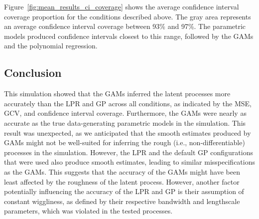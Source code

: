 \documentclass[man, floatsintext]{apa7}
\begin{document}
Figure~\ref{fig:mean_results_ci_coverage} shows the average confidence interval
coverage proportion for the conditions described above. The gray area
represents an average confidence interval coverage between 93\% and 97\%. The
parametric models produced confidence intervals closest to this range, followed
by the GAMs and the polynomial regression.

\begin{sidewaysfigure*}[htbp]
  \caption{Average confidence interval coverage across all processes, analysis
    methods, and simulation conditions}
  \label{fig:mean_results_ci_coverage}
\end{sidewaysfigure*}

\subsection{Conclusion}

This simulation showed that the GAMs inferred the latent processes more
accurately than the LPR and GP across all conditions, as indicated by the MSE,
GCV, and confidence interval coverage. Furthermore, the GAMs were nearly as
accurate as the true data-generating parametric models in the simulation. This
result was unexpected, as we anticipated that the smooth estimates produced by
GAMs might not be well-suited for inferring the rough (i.e.,
non-differentiable) processes in the simulation. However, the LPR and the
default GP configurations that were used also produce smooth estimates, leading
to similar misspecifications as the GAMs. This suggests that the accuracy of
the GAMs might have been least affected by the roughness of the latent process.
However, another factor potentially influencing the accuracy of the LPR and GP
is their assumption of constant wiggliness, as defined by their respective
bandwidth and lengthscale parameters, which was violated in the tested
processes.
\end{document}
